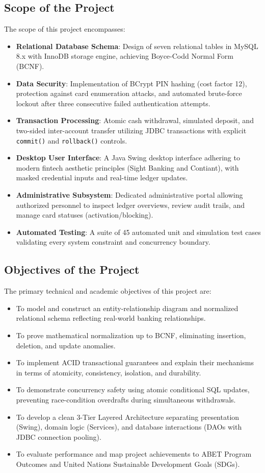 \documentclass[11pt,a4paper]{report}
\begin{document}
\subsection{Scope of the Project}
The scope of this project encompasses:
\begin{itemize}
    \item \textbf{Relational Database Schema}: Design of seven relational tables in MySQL 8.x with InnoDB storage engine, achieving Boyce-Codd Normal Form (BCNF).
    \item \textbf{Data Security}: Implementation of BCrypt PIN hashing (cost factor 12), protection against card enumeration attacks, and automated brute-force lockout after three consecutive failed authentication attempts.
    \item \textbf{Transaction Processing}: Atomic cash withdrawal, simulated deposit, and two-sided inter-account transfer utilizing JDBC transactions with explicit \texttt{commit()} and \texttt{rollback()} controls.
    \item \textbf{Desktop User Interface}: A Java Swing desktop interface adhering to modern fintech aesthetic principles (Sight Banking and Contiant), with masked credential inputs and real-time ledger updates.
    \item \textbf{Administrative Subsystem}: Dedicated administrative portal allowing authorized personnel to inspect ledger overviews, review audit trails, and manage card statuses (activation/blocking).
    \item \textbf{Automated Testing}: A suite of 45 automated unit and simulation test cases validating every system constraint and concurrency boundary.
\end{itemize}

\subsection{Objectives of the Project}
The primary technical and academic objectives of this project are:
\begin{itemize}
    \item To model and construct an entity-relationship diagram and normalized relational schema reflecting real-world banking relationships.
    \item To prove mathematical normalization up to BCNF, eliminating insertion, deletion, and update anomalies.
    \item To implement ACID transactional guarantees and explain their mechanisms in terms of atomicity, consistency, isolation, and durability.
    \item To demonstrate concurrency safety using atomic conditional SQL updates, preventing race-condition overdrafts during simultaneous withdrawals.
    \item To develop a clean 3-Tier Layered Architecture separating presentation (Swing), domain logic (Services), and database interactions (DAOs with JDBC connection pooling).
    \item To evaluate performance and map project achievements to ABET Program Outcomes and United Nations Sustainable Development Goals (SDGs).
\end{itemize}
\end{document}

